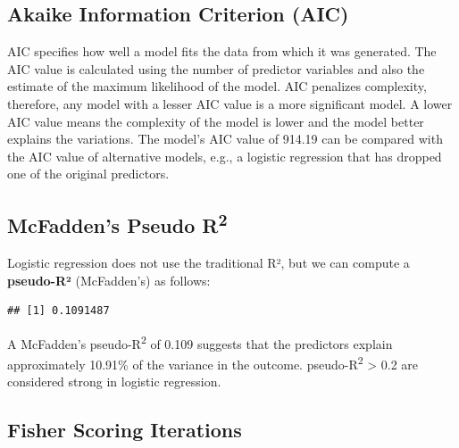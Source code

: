 \documentclass[
]{article}
\newenvironment{Shaded}{\begin{snugshade}}{\end{snugshade}}
\newcommand{\DecValTok}[1]{\textcolor[rgb]{0.00,0.00,0.81}{#1}}
\newcommand{\FunctionTok}[1]{\textcolor[rgb]{0.13,0.29,0.53}{\textbf{#1}}}
\newcommand{\NormalTok}[1]{#1}
\newcommand{\OtherTok}[1]{\textcolor[rgb]{0.56,0.35,0.01}{#1}}
\newcommand{\SpecialCharTok}[1]{\textcolor[rgb]{0.81,0.36,0.00}{\textbf{#1}}}
\begin{document}
\subsection{Akaike Information Criterion
(AIC)}\label{akaike-information-criterion-aic}

AIC specifies how well a model fits the data from which it was
generated. The AIC value is calculated using the number of predictor
variables and also the estimate of the maximum likelihood of the model.
AIC penalizes complexity, therefore, any model with a lesser AIC value
is a more significant model. A lower AIC value means the complexity of
the model is lower and the model better explains the variations. The
model's AIC value of 914.19 can be compared with the AIC value of
alternative models, e.g., a logistic regression that has dropped one of
the original predictors.

\subsection{\texorpdfstring{McFadden's Pseudo
R\textsuperscript{2}}{McFadden's Pseudo R2}}\label{mcfaddens-pseudo-r2}

Logistic regression does not use the traditional R², but we can compute
a \textbf{pseudo-R²} (McFadden's) as follows:

\begin{Shaded}
\end{Shaded}

\begin{verbatim}
## [1] 0.1091487
\end{verbatim}

A McFadden's pseudo-R\textsuperscript{2} of 0.109 suggests that the
predictors explain approximately 10.91\% of the variance in the outcome.
pseudo-R\textsuperscript{2} \textgreater{} 0.2 are considered strong in
logistic regression.

\subsection{Fisher Scoring Iterations}\label{fisher-scoring-iterations}
\end{document}
